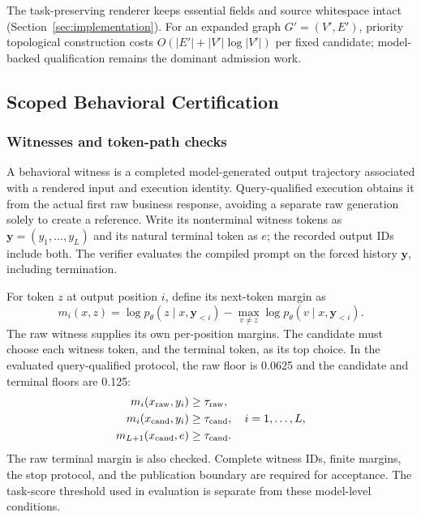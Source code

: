 The task-preserving renderer keeps essential fields and source whitespace intact (Section~\ref{sec:implementation}). For an expanded graph $G'=(V',E')$, priority topological construction costs $O(|E'|+|V'|\log|V'|)$ per fixed candidate; model-backed qualification remains the dominant admission work.

\subsection{Scoped Behavioral Certification}
\label{sec:scope}
\subsubsection{Witnesses and token-path checks}
A behavioral witness is a completed model-generated output trajectory associated with a rendered input and execution identity. Query-qualified execution obtains it from the actual first raw business response, avoiding a separate raw generation solely to create a reference. Write its nonterminal witness tokens as $\mathbf y=(y_1,\ldots,y_L)$ and its natural terminal token as $e$; the recorded output IDs include both. The verifier evaluates the compiled prompt on the forced history $\mathbf y$, including termination.

For token $z$ at output position $i$, define its next-token margin as
\begin{equation}
 m_i(x,z)=\log p_\theta(z\mid x,\mathbf y_{<i})-
 \max_{v\ne z}\log p_\theta(v\mid x,\mathbf y_{<i}).
\label{eq:margin}
\end{equation}
The raw witness supplies its own per-position margins. The candidate must choose each witness token, and the terminal token, as its top choice. In the evaluated query-qualified protocol, the raw floor is 0.0625 and the candidate and terminal floors are 0.125:
\begin{equation}
\begin{aligned}
 m_i(x_{\mathrm{raw}},y_i)&\geq\tau_{\mathrm{raw}},\\
 m_i(x_{\mathrm{cand}},y_i)&\geq\tau_{\mathrm{cand}},\quad i=1,\ldots,L,\\
 m_{L+1}(x_{\mathrm{cand}},e)&\geq\tau_{\mathrm{cand}}.
\end{aligned}
\label{eq:agreement}
\end{equation}
The raw terminal margin is also checked. Complete witness IDs, finite margins, the stop protocol, and the publication boundary are required for acceptance. The task-score threshold used in evaluation is separate from these model-level conditions.

